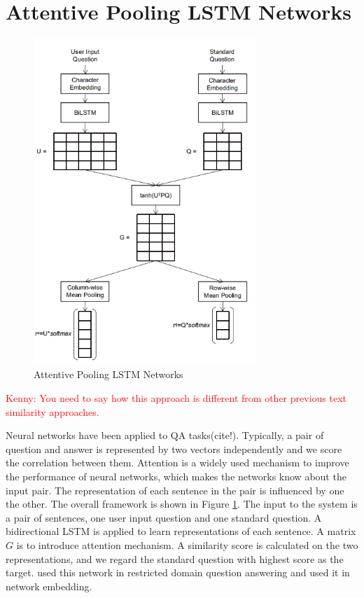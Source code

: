 \documentclass[a4paper,10pt]{article}
\newcommand{\KZ}[1]{\textcolor{red}{Kenny: #1}}
\begin{document}
\section{Attentive Pooling LSTM Networks}
\begin{figure}
\centering
\includegraphics[width=0.75\textwidth]{model.png}
\caption{Attentive Pooling LSTM Networks}
\label{fig:model}
\end{figure}
\KZ{You need to say how this approach is different from other previous
text similarity approaches.}

\par Neural networks have been applied to QA tasks(cite!). Typically, a pair of question and answer is represented by two vectors independently and we score the correlation between them. Attention is a widely used mechanism to improve the performance of neural networks, which makes the networks know about the input pair. The representation of each sentence in the pair is influenced by one the other.  The overall framework is shown in Figure \ref{fig:model}. The input to the system is a pair of sentences, one user input question and one standard question. A bidirectional LSTM is applied to learn representations of each sentence. A matrix $G$ is to introduce attention mechanism. A similarity score is calculated on the two representations, and we regard the standard question with highest score as the target.  \cite{Cicero2016} used this network in restricted domain question answering and \cite{CunchaoTu} used it in network embedding.
\end{document}
